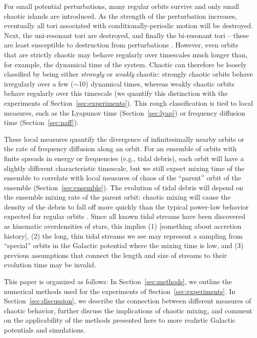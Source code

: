 \documentclass[letterpaper,12pt,preprint]{aastex}
\begin{document}
For small potential perturbations, many regular orbits survive and only small chaotic islands are introduced. As the strength of the perturbation increases, eventually all tori associated with conditionally-periodic motion will be destroyed. Next, the uni-resonant tori are destroyed, and finally the bi-resonant tori -- these are least susceptible to destruction from perturbations \citep[e.g., see][]{valluri98}. However, even orbits that are strictly chaotic may behave regularly over timescales much longer than, for example, the dynamical time of the system. Chaotic can therefore be loosely classified by being either \emph{strongly} or \emph{weakly} chaotic: strongly chaotic orbits behave irregularly over a few ($\sim$10) dynamical times, whereas weakly chaotic orbits behave regularly over this timescale (we quantify this distinction with the experiments of Section~\ref{sec:experiments}). This rough classification is tied to local measures, such as the Lyapunov time (Section~\ref{sec:lyap}) or frequency diffusion time (Section~\ref{sec:naff}). 

These local measures quantify the divergence of infinitesimally nearby orbits or the rate of frequency diffusion along an orbit. For an ensemble of orbits with finite spreads in energy or frequencies (e.g., tidal debris), each orbit will have a slightly different characteristic timescale, but we still expect mixing time of the ensemble to correlate with local measures of chaos of the ``parent'' orbit of the ensemble (Section~\ref{sec:ensemble}). The evolution of tidal debris will depend on the ensemble mixing rate of the parent orbit: chaotic mixing will cause the density of the debris to fall off more quickly than the typical power-law behavior expected for regular orbits \citep[e.g.,][]{merritt96, helmi99}. Since all known tidal streams have been discovered as kinematic overdensities of stars, this implies (1) [something about accretion history], (2) the long, thin tidal streams we see may represent a sampling from ``special'' orbits in the Galactic potential where the mixing time is low, and (3) previous assumptions that connect the length and size of streams to their evolution time may be invalid.

This paper is organized as follows: In Section~\ref{sec:methods}, we outline the numerical methods used for the experiments of Section~\ref{sec:experiments}. In Section~\ref{sec:discussion}, we describe the connection between different measures of chaotic behavior, further discuss the implications of chaotic mixing, and comment on the applicability of the methods presented here to more realistic Galactic potentials and simulations.
\end{document}
